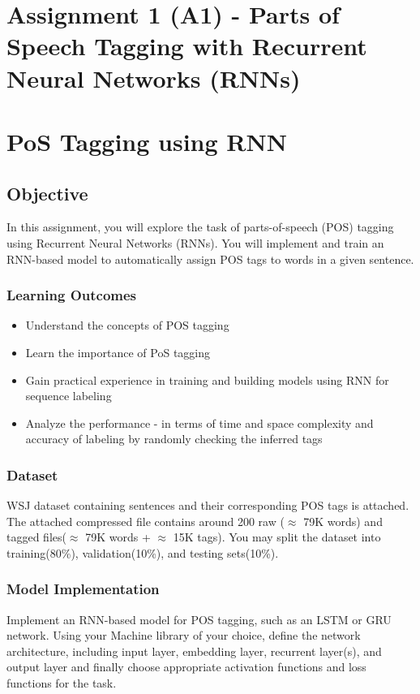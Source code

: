             \section{Assignment 1 (A1) - Parts of Speech Tagging with Recurrent Neural Networks (RNNs)}

\section{PoS Tagging using RNN}
\subsection{Objective}
In this assignment, you will explore the task of parts-of-speech (POS) tagging using Recurrent Neural Networks (RNNs). You will implement and train an RNN-based model to automatically assign POS tags to words in a given sentence.

\subsubsection{Learning Outcomes}
\begin{itemize}
    \item Understand the concepts of POS tagging
    \item Learn the importance of PoS tagging
    \item Gain practical experience in training and building models using RNN for sequence labeling
    \item Analyze the performance - in terms of time and space complexity and accuracy of labeling by randomly checking the inferred tags
\end{itemize}
\subsubsection{Dataset}
WSJ dataset containing sentences and their corresponding POS tags is attached. The attached compressed file contains around 200 raw ($\approx$ 79K words) and tagged files($\approx$ 79K words + $\approx$ 15K tags). You may split the dataset into training(80\%), validation(10\%), and testing sets(10\%).

\subsubsection{Model Implementation}
Implement an RNN-based model for POS tagging, such as an LSTM or GRU network.
Using your Machine library of your choice, define the network architecture, including input layer, embedding layer, recurrent layer(s), and output layer and finally choose appropriate activation functions and loss functions for the task.

